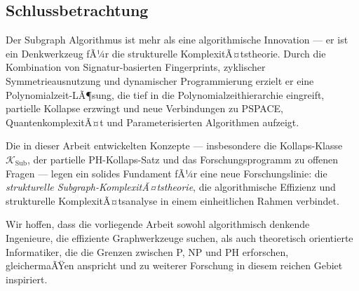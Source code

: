 ﻿\documentclass[a4paper,12pt]{article}
\theoremstyle{definition}
\begin{document}
\subsection{Schlussbetrachtung}

Der Subgraph Algorithmus ist mehr als eine algorithmische Innovation ---
er ist ein Denkwerkzeug fÃ¼r die strukturelle KomplexitÃ¤tstheorie.
Durch die Kombination von Signatur-basierten Fingerprints, zyklischer Symmetrieausnutzung
und dynamischer Programmierung erzielt er eine Polynomialzeit-LÃ¶sung,
die tief in die Polynomialzeithierarchie eingreift, partielle Kollapse erzwingt
und neue Verbindungen zu PSPACE, QuantenkomplexitÃ¤t und Parameterisierten Algorithmen aufzeigt.

Die in dieser Arbeit entwickelten Konzepte --- insbesondere die Kollaps-Klasse
$\mathcal{K}_\mathrm{Sub}$, der partielle PH-Kollaps-Satz und das Forschungsprogramm
zu offenen Fragen --- legen ein solides Fundament fÃ¼r eine neue Forschungslinie:
die \emph{strukturelle Subgraph-KomplexitÃ¤tstheorie}, die algorithmische Effizienz
und strukturelle KomplexitÃ¤tsanalyse in einem einheitlichen Rahmen verbindet.

Wir hoffen, dass die vorliegende Arbeit sowohl algorithmisch denkende Ingenieure,
die effiziente Graphwerkzeuge suchen, als auch theoretisch orientierte Informatiker,
die die Grenzen zwischen P, NP und PH erforschen, gleichermaÃŸen anspricht und
zu weiterer Forschung in diesem reichen Gebiet inspiriert.
\end{document}
